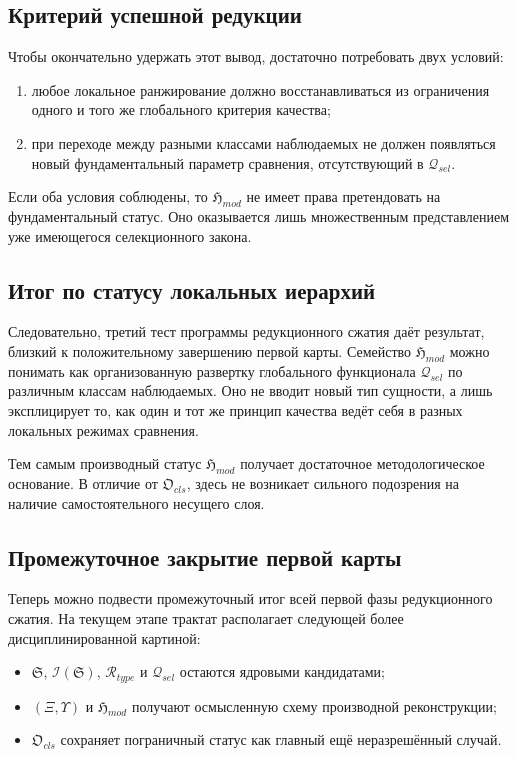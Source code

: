 \documentclass[12pt,a4paper]{article}
\begin{document}
\subsection{Критерий успешной редукции}

Чтобы окончательно удержать этот вывод, достаточно потребовать двух условий:
\begin{enumerate}
    \item любое локальное ранжирование должно восстанавливаться из ограничения одного и того же глобального критерия качества;
    \item при переходе между разными классами наблюдаемых не должен появляться новый фундаментальный параметр сравнения, отсутствующий в \(\mathcal{Q}_{sel}\).
\end{enumerate}

Если оба условия соблюдены, то \(\mathfrak{H}_{mod}\) не имеет права претендовать на фундаментальный статус. Оно оказывается лишь множественным представлением уже имеющегося селекционного закона.

\subsection{Итог по статусу локальных иерархий}

Следовательно, третий тест программы редукционного сжатия даёт результат, близкий к положительному завершению первой карты. Семейство \(\mathfrak{H}_{mod}\) можно понимать как организованную развертку глобального функционала \(\mathcal{Q}_{sel}\) по различным классам наблюдаемых. Оно не вводит новый тип сущности, а лишь эксплицирует то, как один и тот же принцип качества ведёт себя в разных локальных режимах сравнения.

Тем самым производный статус \(\mathfrak{H}_{mod}\) получает достаточное методологическое основание. В отличие от \(\mathfrak{O}_{cls}\), здесь не возникает сильного подозрения на наличие самостоятельного несущего слоя.

\subsection{Промежуточное закрытие первой карты}

Теперь можно подвести промежуточный итог всей первой фазы редукционного сжатия. На текущем этапе трактат располагает следующей более дисциплинированной картиной:
\begin{itemize}
    \item \(\mathfrak{S}\), \(\mathcal{I}(\mathfrak{S})\), \(\mathcal{R}_{type}\) и \(\mathcal{Q}_{sel}\) остаются ядровыми кандидатами;
    \item \((\Xi,\Upsilon)\) и \(\mathfrak{H}_{mod}\) получают осмысленную схему производной реконструкции;
    \item \(\mathfrak{O}_{cls}\) сохраняет пограничный статус как главный ещё неразрешённый случай.
\end{itemize}
\end{document}
